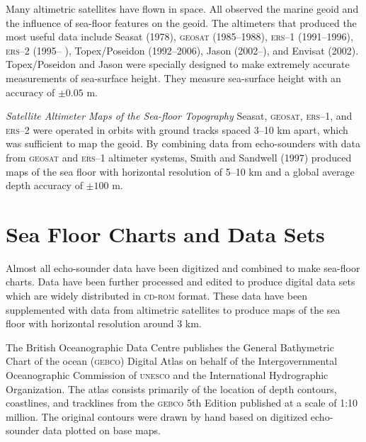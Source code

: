 Many altimetric satellites have flown in space. All observed the
marine geoid and the influence of sea-floor features on
the geoid. The altimeters that produced the most useful
data include Seasat (1978), \textsc{geosat}
(1985--1988), \textsc{ers}--1 (1991--1996),
\textsc{ers}--2 (1995-- ), Topex/Poseidon
(1992--2006), Jason (2002--), and Envisat
(2002).  Topex/Poseidon and Jason were specially
designed to make extremely accurate measurements of sea-surface
height. They measure sea-surface height with an accuracy of $\pm 0.05$
m.

\textit{Satellite Altimeter Maps of the Sea-floor Topography}
Seasat, \textsc{geosat}, \textsc{ers}--1,
and \textsc{ers}--2 were operated in orbits with
ground tracks spaced 3--10 km apart, which was sufficient to map the
geoid. By combining data from echo-sounders with data
from \textsc{geosat} and \textsc{ers}--1 altimeter systems, Smith and
Sandwell (1997) produced maps of the sea floor with horizontal
resolution of 5--10 km and a global average depth accuracy of $\pm
100$ m.

\section{Sea Floor Charts and Data Sets}
Almost all echo-sounder data have been digitized
and combined to make sea-floor charts. Data have been further
processed and edited to produce digital data sets which are widely
distributed in \textsc{cd-rom} format. These data have been
supplemented with data from altimetric satellites to produce maps of
the sea floor with horizontal resolution around 3 km.

The British Oceanographic Data Centre publishes the General
Bathymetric Chart of the ocean (\textsc{gebco}) Digital Atlas on behalf of the Intergovernmental
Oceanographic Commission of \textsc{unesco} and the International
Hydrographic Organization. The atlas consists primarily of the location of depth
contours, coastlines, and tracklines from the \textsc{gebco} 5th
Edition published at a scale of 1:10 million. The original contours
were drawn by hand based on digitized echo-sounder data plotted on
base maps.

